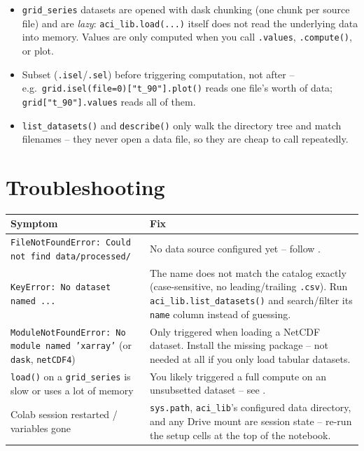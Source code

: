 \documentclass[11pt]{article}
\begin{document}
\begin{itemize}[leftmargin=*]
\item \texttt{grid\_series} datasets are opened with dask chunking (one
  chunk per source file) and are \emph{lazy}: \texttt{aci\_lib.load(...)}
  itself does not read the underlying data into memory. Values are only
  computed when you call \texttt{.values}, \texttt{.compute()}, or plot.
\item Subset (\texttt{.isel}/\texttt{.sel}) before triggering computation,
  not after -- e.g.\ \texttt{grid.isel(file=0)["t\_90"].plot()} reads one
  file's worth of data; \texttt{grid["t\_90"].values} reads all of them.
\item \texttt{list\_datasets()} and \texttt{describe()} only walk the
  directory tree and match filenames -- they never open a data file, so
  they are cheap to call repeatedly.
\end{itemize}

\section{Troubleshooting}

\begin{longtable}{@{}L{5.4cm}L{8.6cm}@{}}
\toprule
\textbf{Symptom} & \textbf{Fix} \\
\midrule
\endhead
\texttt{FileNotFoundError: Could not find data/processed/} & No data source configured yet -- follow . \\
\texttt{KeyError: No dataset named ...} & The name does not match the catalog exactly (case-sensitive, no leading/trailing \texttt{.csv}). Run \texttt{aci\_lib.list\_datasets()} and search/filter its \texttt{name} column instead of guessing. \\
\texttt{ModuleNotFoundError: No module named 'xarray'} (or \texttt{dask}, \texttt{netCDF4}) & Only triggered when loading a NetCDF dataset. Install the missing package -- not needed at all if you only load tabular datasets. \\
\texttt{load()} on a \texttt{grid\_series} is slow or uses a lot of memory & You likely triggered a full compute on an unsubsetted dataset -- see . \\
Colab session restarted / variables gone & \texttt{sys.path}, \texttt{aci\_lib}'s configured data directory, and any Drive mount are session state -- re-run the setup cells at the top of the notebook. \\
\bottomrule
\end{longtable}
\end{document}
